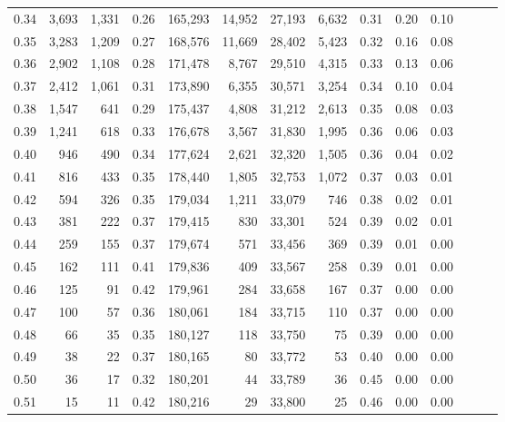 \begin{tabular}{rrrrrrrrrrrrrr}
0.34 &   3,693 &  1,331 &  0.26 &  165,293 &   14,952 &  27,193 &   6,632 &  0.31 &  0.20 &      0.10 \\
0.35 &   3,283 &  1,209 &  0.27 &  168,576 &   11,669 &  28,402 &   5,423 &  0.32 &  0.16 &      0.08 \\
0.36 &   2,902 &  1,108 &  0.28 &  171,478 &    8,767 &  29,510 &   4,315 &  0.33 &  0.13 &      0.06 \\
0.37 &   2,412 &  1,061 &  0.31 &  173,890 &    6,355 &  30,571 &   3,254 &  0.34 &  0.10 &      0.04 \\
0.38 &   1,547 &    641 &  0.29 &  175,437 &    4,808 &  31,212 &   2,613 &  0.35 &  0.08 &      0.03 \\
0.39 &   1,241 &    618 &  0.33 &  176,678 &    3,567 &  31,830 &   1,995 &  0.36 &  0.06 &      0.03 \\
0.40 &     946 &    490 &  0.34 &  177,624 &    2,621 &  32,320 &   1,505 &  0.36 &  0.04 &      0.02 \\
0.41 &     816 &    433 &  0.35 &  178,440 &    1,805 &  32,753 &   1,072 &  0.37 &  0.03 &      0.01 \\
0.42 &     594 &    326 &  0.35 &  179,034 &    1,211 &  33,079 &     746 &  0.38 &  0.02 &      0.01 \\
0.43 &     381 &    222 &  0.37 &  179,415 &      830 &  33,301 &     524 &  0.39 &  0.02 &      0.01 \\
0.44 &     259 &    155 &  0.37 &  179,674 &      571 &  33,456 &     369 &  0.39 &  0.01 &      0.00 \\
0.45 &     162 &    111 &  0.41 &  179,836 &      409 &  33,567 &     258 &  0.39 &  0.01 &      0.00 \\
0.46 &     125 &     91 &  0.42 &  179,961 &      284 &  33,658 &     167 &  0.37 &  0.00 &      0.00 \\
0.47 &     100 &     57 &  0.36 &  180,061 &      184 &  33,715 &     110 &  0.37 &  0.00 &      0.00 \\
0.48 &      66 &     35 &  0.35 &  180,127 &      118 &  33,750 &      75 &  0.39 &  0.00 &      0.00 \\
0.49 &      38 &     22 &  0.37 &  180,165 &       80 &  33,772 &      53 &  0.40 &  0.00 &      0.00 \\
0.50 &      36 &     17 &  0.32 &  180,201 &       44 &  33,789 &      36 &  0.45 &  0.00 &      0.00 \\
0.51 &      15 &     11 &  0.42 &  180,216 &       29 &  33,800 &      25 &  0.46 &  0.00 &      0.00 \\

\end{tabular}
